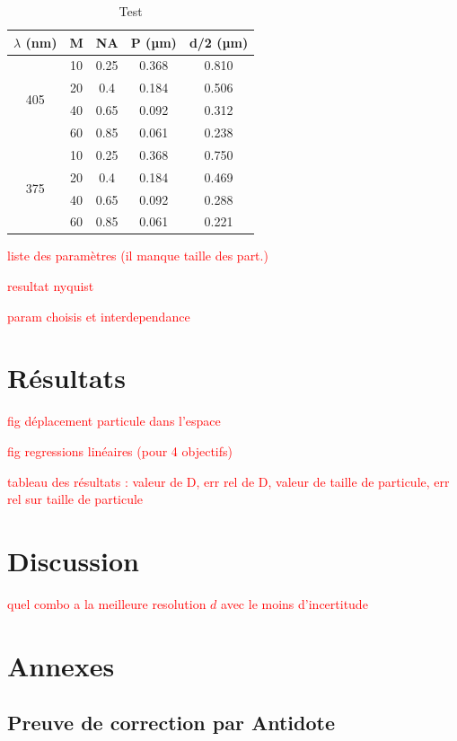 \documentclass[conference]{IEEEtran}
\begin{document}

\begin{table}[!ht]
    \centering
    \caption{Test}
    \begin{tabular}{|c|cc||c|c|}
    \hline
        $\lambda$ (nm) & M & NA & P (µm) & d/2 (µm) \\ \hline\hline
        \multirow{4}{*}{405} & 10 & 0.25 & 0.368 & 0.810 \\ \cline{2-5}
                             & 20 & 0.4  & 0.184 & 0.506 \\ \cline{2-5}
                             & 40 & 0.65 & 0.092 & 0.312 \\ \cline{2-5}
                             & 60 & 0.85 & 0.061 & 0.238 \\ \hline
        \multirow{4}{*}{375} & 10 & 0.25 & 0.368 & 0.750 \\ \cline{2-5}
                             & 20 & 0.4  & 0.184 & 0.469 \\ \cline{2-5}
                             & 40 & 0.65 & 0.092 & 0.288 \\ \cline{2-5}
                             & 60 & 0.85 & 0.061 & 0.221 \\ \hline
    \end{tabular}

\end{table}





\textcolor{red}{liste des paramètres (il manque taille des part.)}

\textcolor{red}{resultat nyquist}

\textcolor{red}{param choisis et interdependance}

\section{Résultats \label{resultats}}

\textcolor{red}{fig déplacement particule dans l'espace}

\textcolor{red}{fig regressions linéaires (pour 4 objectifs)}

\textcolor{red}{tableau des résultats : valeur de D, err rel de D, valeur de taille de particule, err rel sur taille de particule}



\section{Discussion}

\textcolor{red}{quel combo a la meilleure resolution $d$ avec le moins d'incertitude}


\clearpage

\section{Annexes}

\subsection{Preuve de correction par Antidote}

\clearpage
\end{document}
